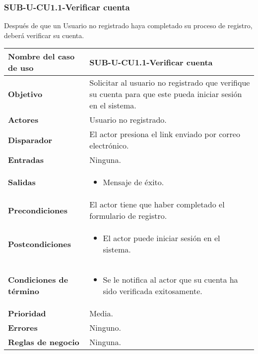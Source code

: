\subsubsection{SUB-U-CU1.1-Verificar cuenta}\label{SUB-U-CU1.1}
Después de que un Usuario no registrado haya completado su proceso de registro, deberá verificar su cuenta.

\begin{longtable}{|J{5cm}|J{10.3cm}|}
	\hline
	\textbf{Nombre del caso de uso} &
		SUB-U-CU1.1-Verificar cuenta \\ \hline
	\textbf{Objetivo} &
		Solicitar al usuario no registrado que verifique su cuenta para que este pueda iniciar sesión en el sistema. \\ \hline
	\textbf{Actores} &
		Usuario no registrado. \\ \hline 
	\textbf{Disparador} & 
		El actor presiona el link enviado por correo electrónico. \\ \hline 
	\textbf{Entradas} & Ninguna.
		\\ \hline 
	\textbf{Salidas} & 
		\begin{itemize}
			\item Mensaje de éxito.
		\end{itemize} \\ \hline
	\textbf{Precondiciones} &
		El actor tiene que haber completado el formulario de registro.\\ \hline
	\textbf{Postcondiciones} &
		\begin{itemize}
			\item El actor puede iniciar sesión en el sistema.
		\end{itemize} \\ \hline
	\textbf{Condiciones de término} & 
		\begin{itemize}
			\item Se le notifica al actor que su cuenta ha sido verificada exitosamente.
		\end{itemize} \\ \hline 
	\textbf{Prioridad} & 
		Media. \\ \hline
	\textbf{Errores} & Ninguno.
		\\ \hline
	\textbf{Reglas de negocio} & Ninguna.
		 \\ \hline
\end{longtable}

